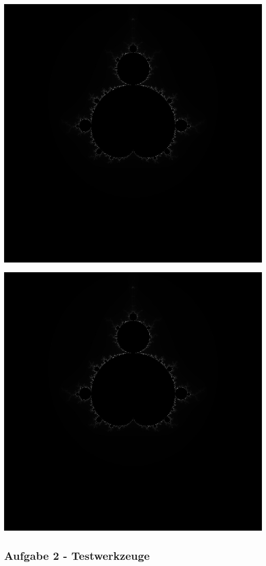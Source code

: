 \documentclass{report}
\begin{document}
	\begin{center}
		\includegraphics[width=0.6\linewidth]{Aufgaben-Ressourcen/normal-1000.jpg}	
	\end{center}
	\begin{center}
		\includegraphics[width=0.6\linewidth]{Aufgaben-Ressourcen/critical-1000.jpg}
	\end{center}
\newpage

    \subsection{Aufgabe 2 - Testwerkzeuge}
\end{document}
